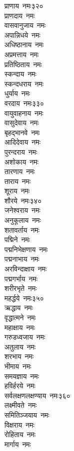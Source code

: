 \begin{multicols}{\maxColumns}
\begin{flushleft}
प्राणाय~नमः\hfill ३२०\\
प्राणदाय~नमः\\
वासवानुजाय~नमः\\
अपान्निधये~नमः\\
अधिष्ठानाय~नमः\\
अप्रमत्ताय~नमः\\
प्रतिष्ठिताय~नमः\\
स्कन्दाय~नमः\\
स्कन्दधराय~नमः\\
धुर्याय~नमः\\
वरदाय~नमः\hfill ३३०\\
वायुवाहनाय~नमः\\
वासुदेवाय~नमः\\
बृहद्भानवे~नमः\\
आदिदेवाय~नमः\\
पुरन्दराय~नमः\\
अशोकाय~नमः\\
तारणाय~नमः\\
ताराय~नमः\\
शूराय~नमः\\
शौरये~नमः\hfill ३४०\\
जनेश्वराय~नमः\\
अनुकूलाय~नमः\\
शतावर्ताय~नमः\\
पद्मिने~नमः\\
पद्मनिभेक्षणाय~नमः\\
पद्मनाभाय~नमः\\
अरविन्दाक्षाय~नमः\\
पद्मगर्भाय~नमः\\
शरीरभृते~नमः\\
महर्द्धये~नमः\hfill ३५०\\
ऋद्धाय~नमः\\
वृद्धात्मने~नमः\\
महाक्षाय~नमः\\
गरुडध्वजाय~नमः\\
अतुलाय~नमः\\
शरभाय~नमः\\
भीमाय~नमः\\
समयज्ञाय~नमः\\
हविर्हरये~नमः\\
सर्वलक्षणलक्षण्याय~नमः\hfill ३६०\\
लक्ष्मीवते~नमः\\
समितिञ्जयाय~नमः\\
विक्षराय~नमः\\
रोहिताय~नमः\\
मार्गाय~नमः\\

\end{flushleft}
\end{multicols}
